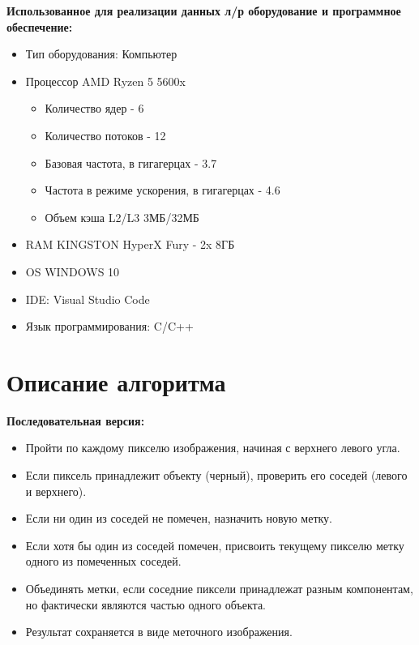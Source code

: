 \documentclass[a4paper, 14pt]{article}
\begin{document}
        \newpage
	\textbf{Использованное для реализации данных л/р оборудование и программное обеспечение:} 
	\vspace{-1em}
	\begin{itemize}[leftmargin=3em]
		\setlength\itemsep{0cm}
		\item Тип оборудования: Компьютер
		\item Процессор AMD Ryzen 5 5600x
                \begin{itemize}
                    \item Количество ядер - 6
                    \item Количество потоков - 12
                    \item Базовая частота, в гигагерцах - 3.7
                    \item Частота в режиме ускорения, в гигагерцах - 4.6
                    \item Объем кэша L2/L3 3МБ/32МБ
                \end{itemize}
            \item RAM KINGSTON HyperX Fury - 2x 8ГБ
            \item OS WINDOWS 10
		\item IDE: Visual Studio Code
		\item Язык программирования: C/C++
	\end{itemize}


	\newpage
	\section*{\centering Описание алгоритма}
	\textbf{Последовательная версия:}
	\vspace{-1em}
	\begin{itemize}[leftmargin=3em]
		\setlength\itemsep{0cm}
            \item Пройти по каждому пикселю изображения, начиная с верхнего левого угла.
            \item Если пиксель принадлежит объекту (черный), проверить его соседей (левого и верхнего).
            \item Если ни один из соседей не помечен, назначить новую метку.
            \item Если хотя бы один из соседей помечен, присвоить текущему пикселю метку одного из помеченных соседей.
            \item Объединять метки, если соседние пиксели принадлежат разным компонентам, но фактически являются частью одного объекта.
            \item Результат сохраняется в виде меточного изображения.
	\end{itemize}
\end{document}
